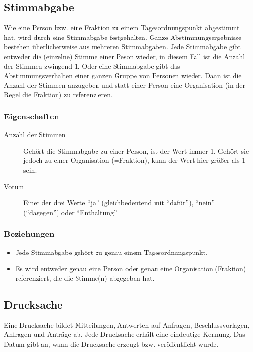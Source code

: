 \subsection{Stimmabgabe}

Wie eine Person bzw. eine Fraktion zu einem Tagesordnungspunkt
abgestimmt hat, wird durch eine Stimmabgabe festgehalten. Ganze
Abstimmungsergebnisse bestehen überlicherweise aus mehreren
Stimmabgaben. Jede Stimmabgabe gibt entweder die (einzelne) Stimme einer
Peson wieder, in diesem Fall ist die Anzahl der Stimmen zwingend 1. Oder
eine Stimmabgabe gibt das Abstimmungsverhalten einer ganzen Gruppe von
Personen wieder. Dann ist die Anzahl der Stimmen anzugeben und statt
einer Person eine Organisation (in der Regel die Fraktion) zu
referenzieren.

\subsubsection{Eigenschaften}

\begin{description}
\item[Anzahl der Stimmen]
Gehört die Stimmabgabe zu einer Person, ist der Wert immer 1. Gehört sie
jedoch zu einer Organisation (=Fraktion), kann der Wert hier größer als
1 sein.
\item[Votum]
Einer der drei Werte ``ja'' (gleichbedeutend mit ``dafür''), ``nein''
(``dagegen'') oder ``Enthaltung''.
\end{description}

\subsubsection{Beziehungen}

\begin{itemize}
\item
  Jede Stimmabgabe gehört zu genau einem Tagesordnungspunkt.
\item
  Es wird entweder genau eine Person oder genau eine Organisation
  (Fraktion) referenziert, die die Stimme(n) abgegeben hat.
\end{itemize}

\subsection{Drucksache}

Eine Drucksache bildet Mitteilungen, Antworten auf Anfragen,
Beschlussvorlagen, Anfragen und Anträge ab. Jede Drucksache erhält eine
eindeutige Kennung. Das Datum gibt an, wann die Drucksache erzeugt bzw.
veröffentlicht wurde.

